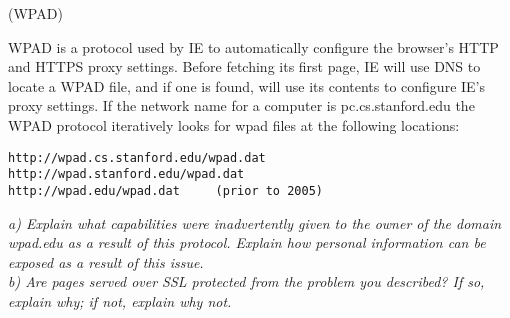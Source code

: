 \begin{prob}  (WPAD) 
\end{prob}

\noindent WPAD is a protocol used by IE to automatically configure the browser's HTTP and HTTPS proxy settings. Before fetching its first page, IE will use DNS to locate a WPAD file, and if one is found, will use its contents to configure IE's proxy settings. If the network name for a computer is pc.cs.stanford.edu the WPAD protocol iteratively looks for wpad files at the following locations:

\begin{verbatim}
http://wpad.cs.stanford.edu/wpad.dat
http://wpad.stanford.edu/wpad.dat
http://wpad.edu/wpad.dat     (prior to 2005)
\end{verbatim}

\noindent \textit{a) Explain what capabilities were inadvertently given to the owner of the domain wpad.edu as a result of this protocol. Explain how personal information can be exposed as a result of this issue.}\\

\noindent \textit{b) Are pages served over SSL protected from the problem you described? If so, explain why; if not, explain why not.}\\